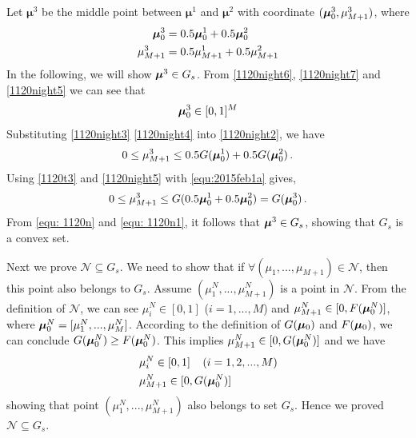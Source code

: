 Let $\boldsymbol{\mu}^3$ be the middle point between $\boldsymbol{\mu}^1$ and $\boldsymbol{\mu}^2$ with coordinate $(\boldsymbol{\mu}_0^3, \mu_{M+1}^3)$, where  
\begin{subequations}
\label{1120t5}
\begin{align}
\label{1120night5}
\boldsymbol{\mu}_0^3 &= 0.5\boldsymbol{\mu}_0^1 + 0.5 \boldsymbol{\mu}_0^2\\
\label{1120night2}
\mu_{M+1}^3 &= 0.5 \mu_{M+1}^1 + 0.5 \mu_{M+1}^2
\end{align}
\end{subequations}
In the following, we will show $\boldsymbol{\mu}^3 \in G_s$.  
From \eqref{1120night6}, \eqref{1120night7} and \eqref{1120night5} we can see that
\begin{equation}
\label{equ: 1120n1}
\boldsymbol{\mu}_0^3 \in [0, 1]^M
\end{equation}
Substituting \eqref{1120night3} \eqref{1120night4} into \eqref{1120night2}, we have
\begin{equation}
  \label{equ:2015feb1a}
0 \leq \mu_{M+1}^3 \leq 0.5 G( \boldsymbol{\mu}_0^1) + 0.5G(\boldsymbol{\mu}_0^2)\,.
\end{equation} 
Using \eqref{1120t3} and \eqref{1120night5} with \eqref{equ:2015feb1a} gives,
\begin{equation}
\label{equ: 1120n}
0 \leq \mu_{M+1}^3 \leq G(0.5 \boldsymbol{\mu}_0^1 + 0.5\boldsymbol{\mu}_0^2) = G(\boldsymbol{\mu}_0^3)\,.
\end{equation}
From \eqref{equ: 1120n} and \eqref{equ: 1120n1}, it follows that  
 $\boldsymbol{\mu}^3 \in G_s$, showing that $G_s$  is a convex set.  

Next we prove $\mathcal{N} \subseteq G_s$. We need to show that if  $\forall (\mu_1, ..., \mu_{M+1}) \in \mathcal{N}$, then this point also belongs to $G_s$.
Assume $(\mu_1^N, ..., \mu_{M+1}^N)$ is a point in $\mathcal{N}$. From the definition of $\mathcal{N}$, we can see 
 $\mu_i^N \in [0, 1]$ ($i = 1, ..., M$) and $\mu_{M+1}^N \in [0, F(\boldsymbol{\mu}_0^N)]$, where $\boldsymbol{\mu}_0^N = [\mu_1^N, ..., \mu_M^N]$. 
According to the definition of $G(\boldsymbol{\mu}_0)$ and $F(\boldsymbol{\mu}_0)$, we can conclude $G(\boldsymbol{\mu}_0^N) \geq F(\boldsymbol{\mu}_0^N)$. 
This implies $\mu_{M+1}^N \in [0, G(\boldsymbol{\mu}_0^N)]$ and we have  
\begin{equation}
\begin{split}
&\mu_i^N \in [0, 1]\;\;\;\;(i=1, 2, ..., M)\\
&\mu_{M+1}^N \in [0, G(\boldsymbol{\mu}_0^N)]
\end{split}
\end{equation}
showing that point $(\mu_1^N, ..., \mu_{M+1}^N)$ also belongs to set $G_s$.
Hence we proved $\mathcal{N} \subseteq G_s$. 

